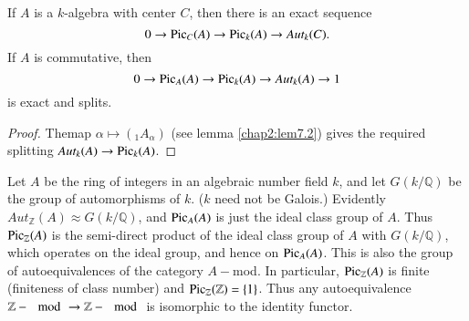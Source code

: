 \begin{prop} %
If $A$ is a $k$-algebra with center $C$, then there is an exact
sequence  
$$
0 \to \operatorname{Pic}_C (A) \to \operatorname{Pic}_k (A) \to Aut_k (C).
$$
If $A$ is commutative, then
$$
0 \to \operatorname{Pic}_A (A) \to \operatorname{Pic}_k (A) \to Aut_k (A) \to 1
$$
is exact and splits.
\end{prop}

\begin{proof}
The\pageoriginale map $\alpha \mapsto (_1 A_\alpha)$ (see lemma
\ref{chap2:lem7.2}) 
gives the required splitting $Aut_k (A) \to \operatorname{Pic}_k (A)$.  
\end{proof}

\begin{example*}
Let $A$ be the ring of integers in an algebraic number field $k$, and
let $G(k/\mathbb{Q})$ be the group of automorphisms of $k$. ($k$ need not be
Galois.) Evidently $Aut_{\mathbb{Z}}(A) \approx G(k/\mathbb{Q})$, and
$\operatorname{Pic}_A(A)$ is just the ideal class group of $A$. Thus
$\operatorname{Pic}_{\mathbb{Z}}(A)$ is the semi-direct product of the ideal class
group of $A$ with $G(k/\mathbb{Q})$, which operates on the ideal group, and
hence on $\operatorname{Pic}_A (A)$. This is also the group of autoequivalences of
the category $A-$mod. In particular, $\operatorname{Pic}_{\mathbb{Z}}(A)$ is finite
(finiteness of class number) and $\operatorname{Pic}_{\mathbb{Z}} (\mathbb{Z}) = \{ 1
\}$. Thus any autoequivalence $\mathbb{Z} - \mod \to \mathbb{Z}- \mod$
is isomorphic to the identity functor. 
\end{example*}

